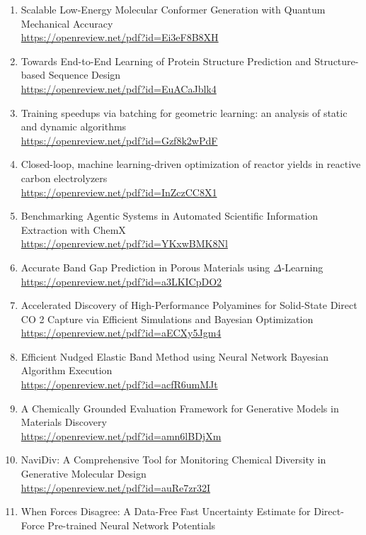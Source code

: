 \begin{enumerate}
        \url{https://openreview.net/pdf?id=Ciw6DbDa4U}
  \item Scalable Low-Energy Molecular Conformer Generation with Quantum Mechanical Accuracy\\
        \url{https://openreview.net/pdf?id=Ei3eF8B8XH}
  \item Towards End-to-End Learning of Protein Structure Prediction and Structure-based Sequence Design\\
        \url{https://openreview.net/pdf?id=EuACaJblk4}
  \item Training speedups via batching for geometric learning: an analysis of static and dynamic algorithms\\
        \url{https://openreview.net/pdf?id=Gzf8k2wPdF}
  \item Closed-loop, machine learning-driven optimization of reactor yields in reactive carbon electrolyzers\\
        \url{https://openreview.net/pdf?id=InZczCC8X1}
  \item Benchmarking Agentic Systems in Automated Scientific Information Extraction with ChemX\\
        \url{https://openreview.net/pdf?id=YKxwBMK8Nl}
  \item Accurate Band Gap Prediction in Porous Materials using $\Delta$-Learning\\
        \url{https://openreview.net/pdf?id=a3LKICpDO2}
  \item Accelerated Discovery of High-Performance Polyamines for Solid-State Direct CO 2 Capture via Efficient Simulations and Bayesian Optimization\\
        \url{https://openreview.net/pdf?id=aECXy5Jgm4}
  \item Efficient Nudged Elastic Band Method using Neural Network Bayesian Algorithm Execution\\
        \url{https://openreview.net/pdf?id=acfR6umMJt}
  \item A Chemically Grounded Evaluation Framework for Generative Models in Materials Discovery\\
        \url{https://openreview.net/pdf?id=amn6lBDjXm}
  \item NaviDiv: A Comprehensive Tool for Monitoring Chemical Diversity in Generative Molecular Design\\
        \url{https://openreview.net/pdf?id=auRe7zr32I}
  \item When Forces Disagree: A Data-Free Fast Uncertainty Estimate for Direct-Force Pre-trained Neural Network Potentials\\

\end{enumerate}
